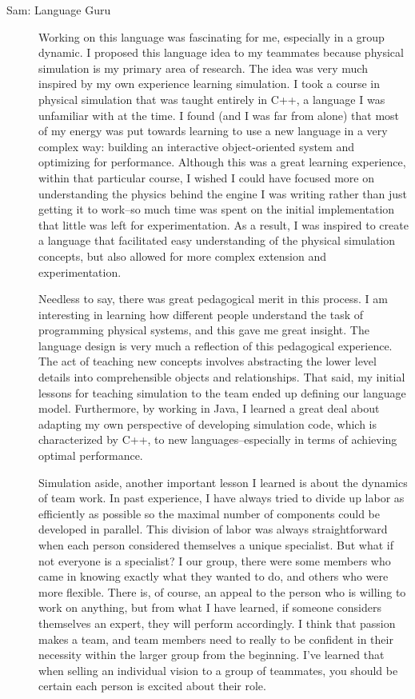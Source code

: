 \begin{description}
\item[Sam: Language Guru] Working on this language was fascinating for
  me, especially in a group dynamic. I proposed this language idea to
  my teammates because physical simulation is my primary area of
  research. The idea was very much inspired by my own experience
  learning simulation. I took a course in physical simulation that was
  taught entirely in C++, a language I was unfamiliar with at the
  time. I found (and I was far from alone) that most of my energy was
  put towards learning to use a new language in a very complex way:
  building an interactive object-oriented system and optimizing for
  performance. Although this was a great learning experience, within
  that particular course, I wished I could have focused more on
  understanding the physics behind the engine I was writing rather
  than just getting it to work--so much time was spent on the initial
  implementation that little was left for
  experimentation. As a result, I was inspired to create a language
  that facilitated easy understanding of the physical simulation
  concepts, but also allowed for more complex extension and
  experimentation.

  Needless to say, there was great pedagogical merit in this
  process. I am interesting in learning how different people
  understand the task of programming physical systems, and this gave
  me great insight. The language design is very much a reflection of
  this pedagogical experience. The act of teaching new concepts
  involves abstracting the lower level details into comprehensible
  objects and relationships. That said, my initial lessons for
  teaching simulation to the team ended up defining our language
  model. Furthermore, by working in Java, I learned a great deal about
  adapting my own perspective of developing simulation code, which is
  characterized by C++, to new languages--especially in terms of
  achieving optimal performance.

  Simulation aside, another important lesson I learned is about the
  dynamics of team work. In past experience, I have always tried to
  divide up labor as efficiently as possible so the maximal number of
  components could be developed in parallel. This division of labor
  was always straightforward when each person considered themselves a
  unique specialist. But what if not everyone is a specialist? I our
  group, there were some members who came in knowing exactly what they
  wanted to do, and others who were more flexible. There is, of
  course, an appeal to the person who is willing to work on anything,
  but from what I have learned, if someone considers themselves an
  expert, they will perform accordingly. I think that passion makes a
  team, and team members need to really to be confident in their
  necessity within the larger group from the beginning. I've learned
  that when selling an individual vision to a group of teammates, you
  should be certain each person is excited about their role.
	

\end{description}
